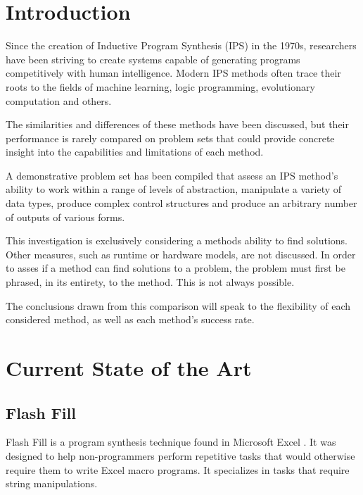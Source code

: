 \section{Introduction}

Since the creation of Inductive Program Synthesis (IPS) in the 1970s\cite{Kitzelmann2009}, researchers have been striving to create systems capable of generating programs competitively with human intelligence. Modern IPS methods often trace their roots to the fields of machine learning, logic programming, evolutionary computation and others.

The similarities and differences of these methods have been discussed\cite{Kitzelmann2009}, but their performance is rarely compared on problem sets that could provide concrete insight into the capabilities and limitations of each method.

A demonstrative problem set has been compiled that assess an IPS method's ability to work within a range of levels of abstraction\cite{Gaunt2016}, manipulate a variety of data types, produce complex control structures and produce an arbitrary number of outputs of various forms\cite{Helmuth2015b}.


This investigation is exclusively considering a methods ability to find solutions. Other measures, such as runtime or hardware models, are not discussed. In order to asses if a method can find solutions to a problem, the problem must first be phrased, in its entirety, to the method. This is not always possible.

The conclusions drawn from this comparison will speak to the flexibility of each considered method, as well as each method's success rate.

\section{Current State of the Art}



\subsection{Flash Fill}

Flash Fill is a program synthesis technique found in Microsoft Excel \cite{Gulwani2011}. It was designed to help non-programmers perform repetitive tasks that would otherwise require them to write Excel macro programs. It specializes in tasks that require string manipulations. 

